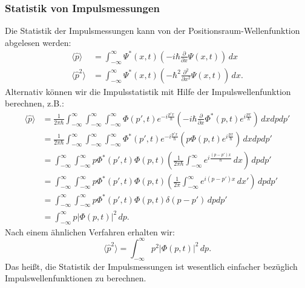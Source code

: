 \subsubsection{Statistik von Impulsmessungen}
Die Statistik der Impulsmessungen kann von der Positionsraum-Wellenfunktion abgelesen werden:
\begin{align}
	\langle \widehat{p}\rangle &= \int_{-\infty}^{\infty} \Psi^*(x,t) \left(-i\hbar \frac{\partial}{\partial x} \Psi(x,t)\right)\,dx \\
	\langle \widehat{p}^2\rangle &= \int_{-\infty}^{\infty} \Psi^*(x,t) \left(-\hbar^2 \frac{\partial^2}{\partial x^2} \Psi(x,t)\right)\,dx.
\end{align}
Alternativ können wir die Impulsstatistik mit Hilfe der Impulswellenfunktion berechnen, z.B.:
\begin{equation}
	\begin{split}
		\langle \widehat{p}\rangle &= \frac{1}{2\pi\hbar}\int_{-\infty}^{\infty}\int_{-\infty}^{\infty}\int_{-\infty}^{\infty} \Phi(p',t)e^{-i\frac{p'x}{\hbar}} \left(-i\hbar \frac{\partial}{\partial x} \Phi^*(p,t)e^{i\frac{px}{\hbar}}\right)\,dxdpdp' \\
		&= \frac{1}{2\pi\hbar}\int_{-\infty}^{\infty}\int_{-\infty}^{\infty}\int_{-\infty}^{\infty} \Phi^*(p',t)e^{-i\frac{p'x}{\hbar}} \left(p \Phi(p,t)e^{i\frac{px}{\hbar}}\right)\,dxdpdp' \\
		&= \int_{-\infty}^{\infty}\int_{-\infty}^{\infty} p \Phi^*(p',t) \Phi(p,t) \left(\frac{1}{2\pi\hbar}\int_{-\infty}^{\infty} e^{i\frac{(p-p')x}{\hbar}}\,dx\right)\,dpdp' \\
		&= \int_{-\infty}^{\infty}\int_{-\infty}^{\infty} p \Phi^*(p',t) \Phi(p,t) \left(\frac{1}{2\pi}\int_{-\infty}^{\infty} e^{i{(p-p')x}}\,dx'\right)\,dpdp' \\
		&= \int_{-\infty}^{\infty}\int_{-\infty}^{\infty} p \Phi^*(p',t) \Phi(p,t) \delta(p-p') \,dpdp'\\
		&= \int_{-\infty}^{\infty} p |\Phi(p,t)|^2 \,dp.
	\end{split}
\end{equation}
Nach einem ähnlichen Verfahren erhalten wir:
\begin{equation}
		\langle \widehat{p}^2\rangle = \int_{-\infty}^{\infty} p^2 |\Phi(p,t)|^2 \,dp.
\end{equation}
Das heißt, die Statistik der Impulsmessungen ist wesentlich einfacher bezüglich Impulswellenfunktionen zu berechnen.


